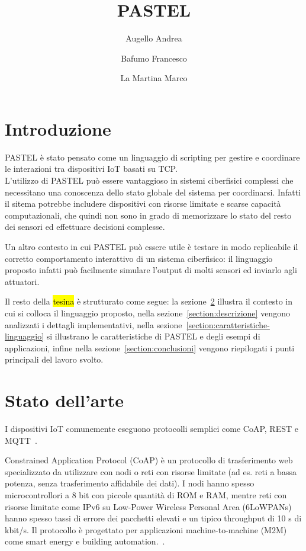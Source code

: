 \documentclass[]{article}
\title{PASTEL}
\author{{Augello Andrea} \and {Bafumo Francesco} \and{La Martina Marco}}
\begin{document}
\maketitle
\tableofcontents


\section{Introduzione}
PASTEL è stato pensato come un linguaggio di scripting per gestire e coordinare le interazioni tra dispositivi IoT basati su TCP.\\
L'utilizzo di PASTEL può essere vantaggioso in sistemi ciberfisici complessi che necessitano una conoscenza dello stato globale del sistema per coordinarsi. Infatti il sitema potrebbe includere dispositivi con risorse limitate e scarse capacità computazionali, che quindi non sono in grado di memorizzare lo stato del resto dei sensori ed effettuare decisioni complesse. 

Un altro contesto in cui PASTEL può essere utile è testare in modo replicabile il corretto comportamento interattivo di un sistema ciberfisico: il linguaggio proposto infatti può facilmente simulare l'output di molti sensori ed inviarlo agli attuatori.

Il resto della \hl{tesina} è strutturato come segue: la sezione~\ref{section:stato-arte} illustra il contesto in cui si colloca il linguaggio proposto, nella sezione~\ref{section:descrizione} vengono analizzati i dettagli implementativi, nella sezione~\ref{section:caratteristiche-linguaggio} si illustrano le caratteristiche di PASTEL e degli esempi di applicazioni, infine nella sezione~\ref{section:conclusioni} vengono riepilogati i punti principali del lavoro svolto.

\section{Stato dell'arte}\label{section:stato-arte}

I dispositivi IoT comunemente eseguono protocolli semplici come CoAP, REST e MQTT~\cite{tandale2017empirical}. 

Constrained Application Protocol (CoAP) è un   protocollo di trasferimento web specializzato da utilizzare con nodi o reti con risorse limitate (ad es. reti a bassa potenza, senza trasferimento affidabile dei dati). I nodi hanno spesso microcontrollori  a 8 bit con piccole quantità di ROM e RAM, mentre reti con risorse limitate come IPv6 su Low-Power Wireless Personal Area  (6LoWPANs) hanno spesso tassi di errore dei pacchetti elevati e un tipico throughput di 10 s di kbit/s. Il protocollo è progettato per applicazioni  machine-to-machine (M2M) come smart energy e building automation.~\cite{shelby2014constrained}.
\end{document}

